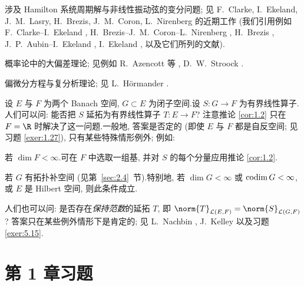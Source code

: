 涉及 Hamilton 系统周期解与非线性振动弦的变分问题; 见 F.~Clarke, I.~Ekeland, J.~M.~Lasry, H.~Brezis, J.~M.~Coron, L.~Nirenberg 的近期工作 (我们引用例如
F.~Clarke--I.~Ekeland , H.~Brezis--J.~M.~Coron--L.~Nirenberg , H.~Brezis , J.~P.~Aubin--I.~Ekeland , I.~Ekeland , 以及它们所列的文献).

概率论中的大偏差理论; 见例如 R.~Azencott 等 , D.~W.~Stroock .

偏微分方程与复分析理论; 见 L.~Hörmander .

设 $E$ 与 $F$ 为两个 Banach 空间, $G\subset E$ 为闭子空间.设
$S:G\to F$ 为有界线性算子.人们可以问: 能否把 $S$ 延拓为有界线性算子
$T:E\to F$? 注意推论  \ref{cor:1.2} 只在 $F=\R$ 时解决了这一问题.一般地,
答案是否定的 (即使 $E$ 与 $F$ 都是自反空间; 见习题  \ref{exer:1.27}),
只有某些特殊情形例外; 例如:

若 $\dim F<\infty$.可在 $F$ 中选取一组基, 并对 $S$ 的每个分量应用推论  \ref{cor:1.2}.

若 $G$ 有拓扑补空间 (见第~\ref{sec:2.4}~节).特别地, 若 $\dim G<\infty$ 或
$\operatorname{codim} G<\infty$, 或 $E$ 是 Hilbert 空间, 则此条件成立.

人们也可以问: 是否存在\emph{保持范数}的延拓 $T$, 即
$\norm{T}_{\LL(E,F)}=\norm{S}_{\LL(G,F)}$? 答案只在某些例外情形下是肯定的;
见 L.~Nachbin , J.~Kelley  以及习题  \ref{exer:5.15}.

\section*{第 1 章习题}

